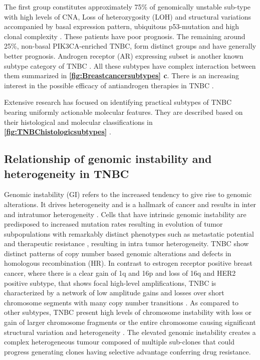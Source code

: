 The first group constitutes approximately 75\% of genomically unstable sub-type with high levels of \ac{CNA}, Loss of heterozygosity (LOH) and structural variations accompanied by basal expression pattern, ubiquitous p53-mutation and high clonal complexity \cite{shah2012clonal, garrido2019insights}. These patients have poor prognosis. The remaining around 25\%,  non-basal PIK3CA-enriched TNBC, form distinct groups and have generally better prognosis. Androgen receptor (AR) expressing subset is another known subtype category of TNBC \cite{tang2012expression, rakha2007prognostic,mrklic2013expression}. All these subtypes have complex interaction between them summarized in \textbf{\autoref{fig:Breastcancersubtypes} c}.
There is an increasing interest in the possible efficacy of antiandrogen therapies in TNBC \cite{gerratana2018androgen,gucalp2013phase}.

 Extensive research has focused on identifying practical subtypes of TNBC bearing uniformly actionable molecular features. They are described based on their histological and molecular classifications in \textbf{\autoref{fig:TNBChistologicsubtypes}} \cite{weigelt2009histological,bianchini2016triple}. 

\subsection{Relationship of genomic instability and heterogeneity in TNBC}
Genomic instability (GI) refers to the increased tendency to give rise to genomic alterations. It drives heterogeneity and is a hallmark of cancer and results in inter and intratumor heterogeneity \cite{hanahan2011hallmarks}.
 Cells that have intrinsic genomic instability are predisposed to increased mutation rates resulting in evolution of tumor subpopulations with remarkably distinct phenotypes such as metastatic potential and therapeutic resistance \cite{fidler1978tumor, burrell2013causes,januvskevivciene2019heterogeneity}, resulting in intra tumor heterogeneity. 
TNBC show distinct patterns of copy number based genomic alterations and defects in homologous recombination (HR). In contrast to estrogen receptor positive breast cancer, where there is a clear gain of 1q and 16p and loss of 16q and HER2 positive subtype, that shows focal high-level amplifications, TNBC is characterized by a network of low amplitude gains and losses over short chromosome segments with many copy number transitions \cite{kwei2010genomic}.
As compared to other subtypes, TNBC present high levels of chromosome instability with loss or gain of larger chromosome fragments or the entire chromosome causing significant structural variation and heterogeneity \cite{lee2016mechanisms}.
The elevated genomic instability creates a complex heterogeneous tumour composed of multiple sub-clones that could progress generating clones having selective advantage conferring drug resistance. 

